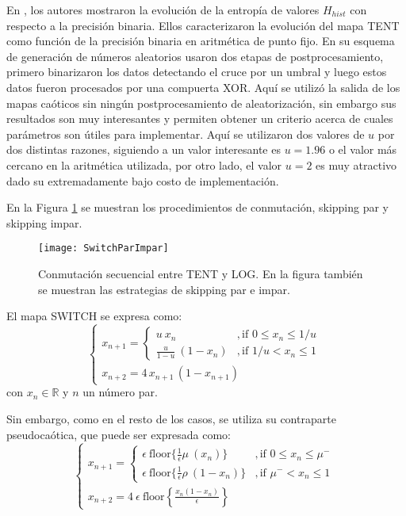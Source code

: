 En \cite{DelaFraga2017}, los autores mostraron la evolución de la entropía de valores $H_{hist}$ con respecto a la precisión binaria. Ellos caracterizaron la evolución del mapa TENT como función de la precisión binaria en aritmética de punto fijo.
En su esquema de generación de números aleatorios usaron dos etapas de postprocesamiento, primero binarizaron los datos detectando el cruce por un umbral y luego estos datos fueron procesados por una compuerta XOR.
Aquí se utilizó la salida de los mapas caóticos sin ningún postprocesamiento de aleatorización, sin embargo sus resultados son muy interesantes y permiten obtener un criterio acerca de cuales parámetros son útiles para implementar.
Aquí se utilizaron dos valores de $u$ por dos distintas razones, siguiendo a \cite{DelaFraga2017} un valor interesante es $u = 1.96$ o el valor más cercano en la aritmética utilizada, por otro lado, el valor $u=2$ es muy atractivo dado su extremadamente bajo costo de implementación.

En la Figura \ref{fig:seq} se muestran los procedimientos de conmutación, skipping par y skipping impar.

\begin{figure}[htpb]
\centering	
	\texttt{[image: SwitchParImpar]}
	\caption{Conmutación secuencial entre TENT y LOG. En la figura también se muestran las estrategias de skipping par e impar.} \label{fig:seq}
\end{figure}

El mapa SWITCH se expresa como:
%
\begin{equation}\label{eq:SWITCH}
\begin{cases}
x_{n+1}=
\begin{cases}
u~x_n &, \textrm{if } 0\leq x_n\leq 1/u\\
\frac{u}{1-u}~(1-x_n) &, \textrm{if } 1/u< x_n\leq 1 
\end{cases} \\
x_{n+2}=4\,x_{n+1}\,(1-x_{n+1})
\end{cases}
\end{equation}
%
con $x_n \in \mathbb{R}$ y $n$ un número par.

Sin embargo, como en el resto de los casos, se utiliza su contraparte pseudocaótica, que puede ser expresada como:
%
\begin{equation}\label{eq:SWITCHB2}
\begin{cases}
x_{n+1}=
\begin{cases}
\epsilon ~\text{floor} \{\frac{1}{\epsilon} \mu~(x_n)\} &, \textrm{if } 0\leq x_n\leq \mu^-\\
\epsilon ~\text{floor} \{\frac{1}{\epsilon} \rho~(1-x_n)\} &, \textrm{if } \mu^-<x_n\leq 1
\end{cases} \\
x_{n+2}=4 ~\epsilon ~\text{floor}\left\{\frac{x_n(1-x_n)}{\epsilon}\right\}
\end{cases}
\end{equation}

